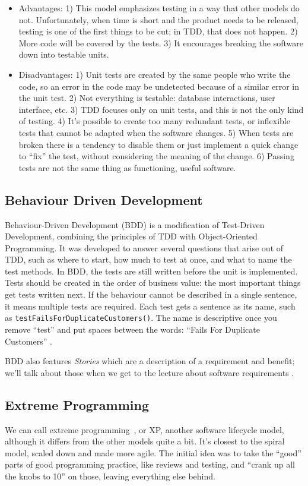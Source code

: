 \begin{itemize}
	\item Advantages: 
		1) This model emphasizes testing in a way that other models do not. Unfortunately, when time is short and the product needs to be released, testing is one of the first things to be cut; in TDD, that does not happen. 
		2) More code will be covered by the tests.
		3) It encourages breaking the software down into testable units.
	\item Disadvantages:
		1) Unit tests are created by the same people who write the code, so an error in the code may be undetected because of a similar error in the unit test.
		2) Not everything is testable: database interactions, user interface, etc.
		3) TDD focuses only on unit tests, and this is not the only kind of testing.
		4) It's possible to create too many redundant tests, or inflexible tests that cannot be adapted when the software changes.
		5) When tests are broken there is a tendency to disable them or just implement a quick change to ``fix'' the test, without considering the meaning of the change.
		6) Passing tests are not the same thing as functioning, useful software.
\end{itemize}

\subsection*{Behaviour Driven Development}
Behaviour-Driven Development (BDD) is a modification of Test-Driven Development, combining the principles of TDD with Object-Oriented Programming. It was developed to answer several questions that arise out of TDD, such as where to start, how much to test at once, and what to name the test methods. In BDD, the tests are still written before the unit is implemented. Tests should be created in the order of business value: the most important things get tests written next. If the behaviour cannot be described in a single sentence, it means multiple tests are required. Each test gets a sentence as its name, such as \texttt{testFailsForDuplicateCustomers()}. The name is descriptive once you remove ``test'' and put spaces between the words: ``Fails For Duplicate Customers'' \cite{bdd}.

BDD also features \textit{Stories} which are a description of a requirement and benefit; we'll talk about those when we get to the lecture about software requirements \cite{bdd2}.


\subsection*{Extreme Programming}
We can call extreme programming~\cite{Beck:2004:EPE:1076267}, or XP, another
software lifecycle model, although it differs from the other models
quite a bit. It's closest to the spiral model, scaled down and made
more agile. The initial idea was to take the ``good'' parts of good
programming practice, like reviews and testing, and ``crank up all the knobs to
10''\cite{ivkb}
on those, leaving everything else behind.

